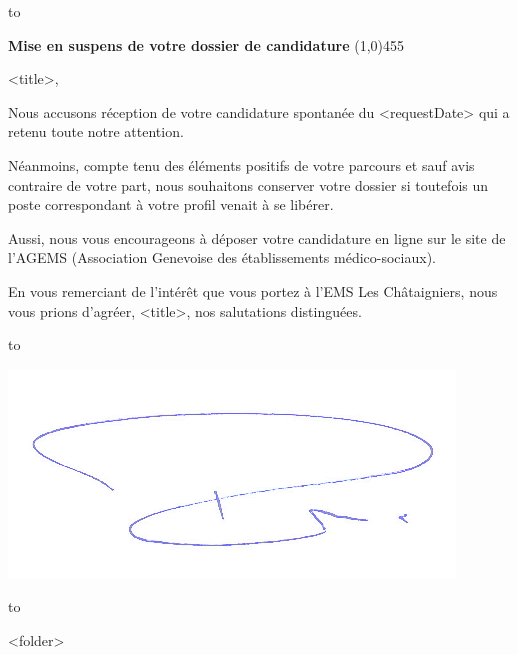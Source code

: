 \documentclass[a4paper, 12pt]{letter}
\begin{document}

\hbox to 

\bigbreak

\begin{flushleft}
	\textbf{Mise en suspens de votre dossier de candidature}
	\line(1,0){455}
\end{flushleft}
\bigbreak

<title>,

Nous accusons réception de votre candidature spontanée du <requestDate> qui a retenu toute notre attention.

Néanmoins, compte tenu des éléments positifs de votre parcours et sauf avis contraire de votre part, nous souhaitons conserver votre dossier si toutefois un poste correspondant à votre profil venait à se libérer.

Aussi, nous vous encourageons à déposer votre candidature en ligne sur le site de l’AGEMS (Association Genevoise des établissements médico-sociaux).

En vous remerciant de l’intérêt que vous portez à l’EMS Les Châtaigniers, nous vous prions d’agréer, <title>, nos salutations distinguées.

\bigbreak
\bigbreak
\bigbreak
\bigbreak

\hbox to 
\begin{flushright}
\includegraphics{sign.png}
\end{flushright}

\hbox to 

\bigbreak
\bigbreak

<folder>
\end{document}
